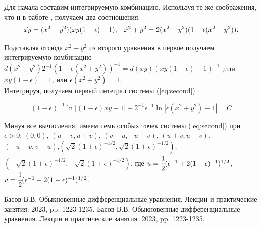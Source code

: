 \documentclass{article}
\begin{document}
Для начала составим интегрируемую комбинацию. Используя те же соображения, что и в работе \cite{basov}, получаем два соотношения:
\begin{equation*}
\dot{xy} = (x^2-y^2)(xy(1-\epsilon)-1)\hbox{,\hspace{10pt}} \dot x^2+\dot y^2 = 2(x^2-y^2)(1-\epsilon(x^2+y^2)).
\end{equation*}

Подставляя отсюда $x^2-y^2$ из второго уравнения в первое получаем интегрируемую комбинацию $d(x^2+y^2)2^{-1}(1-\epsilon(x^2+y^2))^{-1}=d(xy)(xy(1-\epsilon)-1)^{-1}$ ,или $xy(1-\epsilon)=1$, или $\epsilon(x^2+y^2)=1$.\\

Интегрируя, получаем первый интеграл системы (\ref{eq:second}) 

\begin{equation}
    (1-\epsilon)^{-1}\ln|(1-\epsilon)xy -1|+2^{-1}\epsilon^{-1}\ln{|\epsilon(x^2+y^2)-1|}=C
\end{equation}

Минуя все вычисления, имеем семь особых точек системы (\ref{eq:second}) при $\epsilon > 0$: $(0,0)$, $(u-v,u+v)$, $(v-u,-u-v)$, $(u+v,u-v)$, $(-u-v,v-u)$,$(\sqrt{2}(1+\epsilon)^{-1/2}, \sqrt{2}(1+\epsilon)^{-1/2})$, $(-\sqrt{2}(1+\epsilon)^{-1/2}, -\sqrt{2}(1+\epsilon)^{-1/2})$, где $u=\cfrac{1}{2}(\epsilon^{-1}+2(1-\epsilon)^{-1})^{1/2}$, $v= \cfrac{1}{2}(\epsilon^{-1}-2(1-\epsilon)^{-1})^{1/2}$.

 \begin{thebibliography}{1}
 Басов В.В. \flqq 	Обыкновенные дифференциальные уравнения. Лекции и практические занятия\frqq. 2023, pp. 1223-1235.
 Басов В.В. \flqq 	Обыкновенные дифференциальные уравнения. Лекции и практические занятия\frqq. 2023, pp. 1223-1235.
\end{thebibliography}
\end{document}
